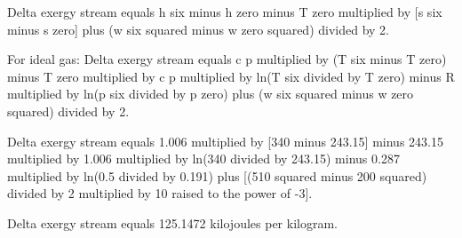 Delta exergy stream equals h six minus h zero minus T zero multiplied by [s six minus s zero] plus (w six squared minus w zero squared) divided by 2.  

For ideal gas:  
Delta exergy stream equals c p multiplied by (T six minus T zero) minus T zero multiplied by c p multiplied by ln(T six divided by T zero) minus R multiplied by ln(p six divided by p zero) plus (w six squared minus w zero squared) divided by 2.  

Delta exergy stream equals 1.006 multiplied by [340 minus 243.15] minus 243.15 multiplied by 1.006 multiplied by ln(340 divided by 243.15) minus 0.287 multiplied by ln(0.5 divided by 0.191) plus [(510 squared minus 200 squared) divided by 2 multiplied by 10 raised to the power of -3].  

Delta exergy stream equals 125.1472 kilojoules per kilogram.